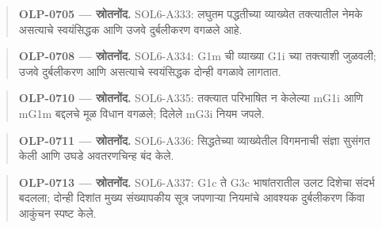 \begin{quote}\small\textbf{OLP-0705 — स्रोतनोंद.} SOL6-A333: लघुतम पद्धतीच्या व्याख्येत तक्त्यातील नेमके असत्याचे स्वयंसिद्धक आणि उजवे दुर्बलीकरण वगळले आहे.\end{quote}
\begin{quote}\small\textbf{OLP-0708 — स्रोतनोंद.} SOL6-A334: G1m ची व्याख्या G1i च्या तक्त्याशी जुळवली; उजवे दुर्बलीकरण आणि असत्याचे स्वयंसिद्धक दोन्ही वगळावे लागतात.\end{quote}
\begin{quote}\small\textbf{OLP-0710 — स्रोतनोंद.} SOL6-A335: तक्त्यात परिभाषित न केलेल्या mG1i आणि mG1m बद्दलचे मूळ विधान वगळले; दिलेले mG3i नियम जपले.\end{quote}
\begin{quote}\small\textbf{OLP-0711 — स्रोतनोंद.} SOL6-A336: सिद्धतेच्या व्याख्येतील विगमनाची संज्ञा सुसंगत केली आणि उघडे अवतरणचिन्ह बंद केले.\end{quote}
\begin{quote}\small\textbf{OLP-0713 — स्रोतनोंद.} SOL6-A337: G1c ते G3c भाषांतरातील उलट दिशेचा संदर्भ बदलला; दोन्ही दिशांत मुख्य संख्यापकीय सूत्र जपणाऱ्या नियमांचे आवश्यक दुर्बलीकरण किंवा आकुंचन स्पष्ट केले.\end{quote}



